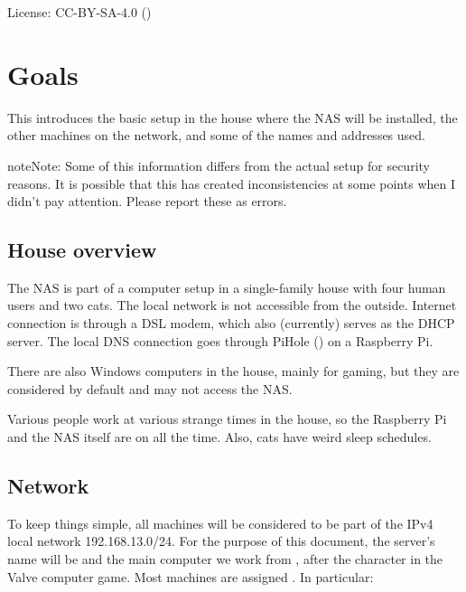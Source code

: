 \documentclass[a4paper,10pt,english]{sphinxmanual}
\begin{document}
License: CC-BY-SA-4.0 ()


\chapter{Goals}
\label{\detokenize{goals:goals}}\label{\detokenize{goals::doc}}
This introduces the basic setup in the house where the NAS will be installed,
the other machines on the network, and some of the names and addresses used.

\begin{sphinxadmonition}{note}{Note:}
Some of this information differs from the actual setup for security
reasons. It is possible that this has created inconsistencies at some
points when I didn’t pay attention. Please report these as errors.
\end{sphinxadmonition}


\section{House overview}
\label{\detokenize{goals:house-overview}}
The NAS is part of a computer setup in a single-family house with four human
users and two cats. The local network is not accessible from the outside.
Internet connection is through a DSL modem, which also (currently) serves as the
DHCP server. The local DNS connection goes through PiHole ()
on a Raspberry Pi.

There are also Windows computers in the house, mainly for gaming, but they are
considered  by default and may not access the NAS.

Various people work at various strange times in the house, so the Raspberry Pi
and the NAS itself are on all the time. Also, cats have weird sleep schedules.


\section{Network}
\label{\detokenize{goals:network}}
To keep things simple, all machines will be considered to be part of the IPv4
local network 192.168.13.0/24. For the purpose of this document, the server’s
name will be  and the main computer we work from , after the
character in the Valve computer game. Most machines are assigned . In particular:
\end{document}
